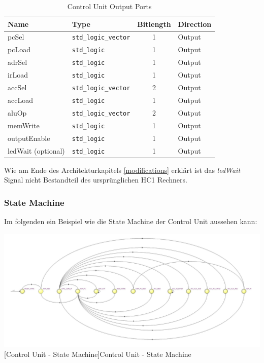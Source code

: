 \vspace{1em}
\begin{table}[!h]
	\centering
	\begin{tabular}{|l|l|c|l|}
		\hline
		\textbf{Name} & \textbf{Type} & \textbf{Bitlength} & \textbf{Direction}\\
		\hline
		pcSel & \texttt{std\_logic\_vector} & 1 & Output \\
		\hline
		pcLoad & \texttt{std\_logic} & 1 & Output \\
		\hline
		adrSel & \texttt{std\_logic} & 1 & Output \\
		\hline
		irLoad & \texttt{std\_logic} & 1 & Output \\
		\hline
		accSel & \texttt{std\_logic\_vector} & 2 & Output \\
		\hline
		accLoad & \texttt{std\_logic} & 1 & Output \\
		\hline
		aluOp & \texttt{std\_logic\_vector} & 2 & Output \\
		\hline
		memWrite & \texttt{std\_logic} & 1 & Output \\
		\hline
		outputEnable & \texttt{std\_logic} & 1 & Output \\
		\hline
		ledWait (optional) & \texttt{std\_logic} & 1 & Output \\
		\hline
	\end{tabular}
	\caption{Control Unit Output Ports}
	\label{tab:ctrl_ports_out}
\end{table}

Wie am Ende des Architekturkapitels \ref{modifications} erklärt ist das \emph{ledWait} Signal nicht Bestandteil des ursprünglichen HC1 Rechners.

\subsubsection{State Machine}

Im folgenden ein Beispiel wie die State Machine der Control Unit aussehen kann:

\vspace{1em}
\begin{minipage}{\linewidth}
    \centering
    \includegraphics[width=1.0\linewidth]{images/state_machine.jpg}\\
    [Control Unit - State Machine]{Control Unit - State Machine}
    \label{fig:ctrl_state}
\end{minipage}

